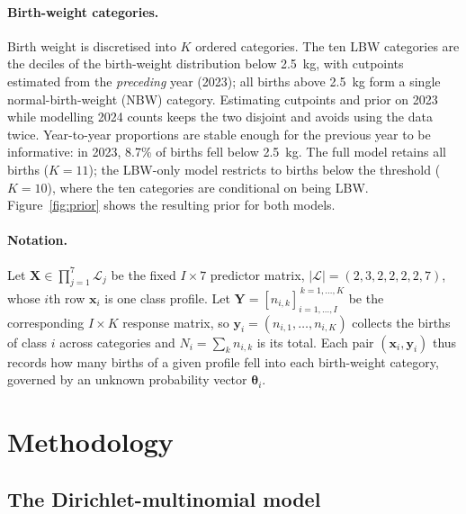 \paragraph{Birth-weight categories.}
Birth weight is discretised into $K$ ordered categories. The ten LBW categories
are the deciles of the birth-weight distribution below 2.5~kg, with cutpoints
estimated from the \emph{preceding} year (2023); all births above 2.5~kg form a
single normal-birth-weight (NBW) category. Estimating cutpoints and prior on
2023 while modelling 2024 counts keeps the two disjoint and avoids using the
data twice. Year-to-year proportions are stable enough for the previous year to
be informative: in 2023, 8.7\% of births fell below 2.5~kg. The full model
retains all births ($K=11$); the LBW-only model restricts to births below the
threshold ($K=10$), where the ten categories are conditional on being LBW.
Figure~\ref{fig:prior} shows the resulting prior for both models.

\paragraph{Notation.}
Let $\mathbf{X}\in\prod_{j=1}^{7}\mathcal{L}_j$ be the fixed
$I\times 7$ predictor matrix, $|\mathcal{L}|=(2,3,2,2,2,2,7)$, whose $i$th row
$\mathbf{x}_i$ is one class profile. Let
$\mathbf{Y}=[n_{i,k}]_{i=1,\dots,I}^{\,k=1,\dots,K}$ be the corresponding
$I\times K$ response matrix, so $\mathbf{y}_i=(n_{i,1},\dots,n_{i,K})$ collects
the births of class $i$ across categories and $N_i=\sum_{k}n_{i,k}$ is its
total. Each pair $(\mathbf{x}_i,\mathbf{y}_i)$ thus records how many births of
a given profile fell into each birth-weight category, governed by an unknown
probability vector $\boldsymbol{\theta}_i$.

\section{Methodology}
\label{sec:methods}
\fontsize{12}{14}\selectfont

\subsection{The Dirichlet-multinomial model}

